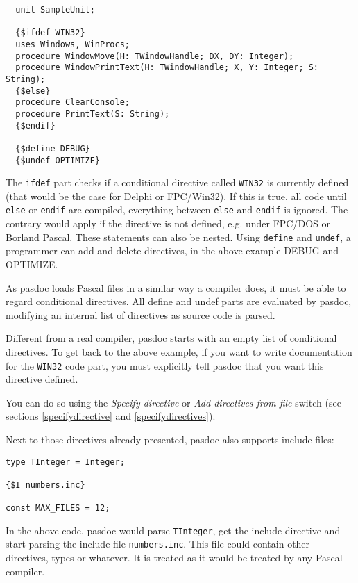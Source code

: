 \documentclass[11pt]{article}
\begin{document}
\begin{verbatim}
  unit SampleUnit;

  {$ifdef WIN32}
  uses Windows, WinProcs;
  procedure WindowMove(H: TWindowHandle; DX, DY: Integer);
  procedure WindowPrintText(H: TWindowHandle; X, Y: Integer; S: String);
  {$else}
  procedure ClearConsole;
  procedure PrintText(S: String);
  {$endif}

  {$define DEBUG}
  {$undef OPTIMIZE}
\end{verbatim}

The {\tt ifdef} part checks if a conditional directive called {\tt WIN32} is
currently defined (that would be the case for Delphi or FPC/Win32).
If this is true, all code until {\tt else} or {\tt endif} are compiled,
everything between {\tt else} and {\tt endif} is ignored.
The contrary would apply if the directive is not defined, e.g. under FPC/DOS
or Borland Pascal.
These statements can also be nested.
Using {\tt define} and {\tt undef}, a programmer can add and delete
directives, in the above example DEBUG and OPTIMIZE.

As pasdoc loads Pascal files in a similar way a compiler does, it must be able
to regard conditional directives. All define and undef parts are evaluated by 
pasdoc, modifying an internal list of directives as source code is parsed.

Different from a real compiler, pasdoc starts with an empty list of
conditional directives. To get back to the above example, if you want to write 
documentation for the {\tt WIN32} code part, you must explicitly tell pasdoc 
that you want this directive defined.

You can do so using the \emph{Specify directive} or \emph{Add directives from
file} switch (see sections \ref{specifydirective} and \ref{specifydirectives}).

Next to those directives already presented, pasdoc also supports include
files:

\begin{verbatim}
type TInteger = Integer;

{$I numbers.inc}

const MAX_FILES = 12;
\end{verbatim}

In the above code, pasdoc would parse {\tt TInteger}, get the include
directive and start parsing the include file {\tt numbers.inc}.
This file could contain other directives, types or whatever.
It is treated as it would be treated by any Pascal compiler.
\end{document}
